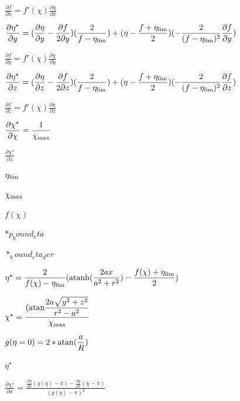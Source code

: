 \documentclass{article}
\begin{document}
$ \displaystyle\frac{\partial f}{\partial x} = f'(\chi) \displaystyle\frac{\partial \chi}{\partial x}$
\pagebreak

$ \displaystyle\frac{\partial \eta^\star}{\partial y } = (\displaystyle\frac{\partial \eta}{\partial y} - \displaystyle\frac{\partial f}{2\partial y}) (\displaystyle\frac{2}{f - \eta_{\rm lim}}) + (\eta - \displaystyle\frac{f+\eta_{\rm lim}}{2}) (-\displaystyle\frac{2}{(f-\eta_{\rm lim})^2} \displaystyle\frac{\partial f}{\partial y}) $
\pagebreak

$ \displaystyle\frac{\partial f}{\partial y} = f'(\chi) \displaystyle\frac{\partial \chi}{\partial y}$
\pagebreak

$ \displaystyle\frac{\partial \eta^\star}{\partial z } = (\displaystyle\frac{\partial \eta}{\partial z} - \displaystyle\frac{\partial f}{2\partial z}) (\displaystyle\frac{2}{f - \eta_{\rm lim}}) + (\eta - \displaystyle\frac{f+\eta_{\rm lim}}{2}) (-\displaystyle\frac{2}{(f-\eta_{\rm lim})^2} \displaystyle\frac{\partial f}{\partial z}) $
\pagebreak

$ \displaystyle\frac{\partial f}{\partial z} = f'(\chi) \displaystyle\frac{\partial \chi}{\partial z}$
\pagebreak

$ \displaystyle\frac{\partial \chi^\star}{\partial \chi } = \displaystyle\frac{1}{\chi_{\rm max}} $
\pagebreak

$ \displaystyle\frac{\partial \chi^\star}{\partial z} $
\pagebreak

$ \eta_{\rm lim} $
\pagebreak

$ \chi_{\rm max} $
\pagebreak

$ f(\chi) $
\pagebreak

$ *p_bound_eta $
\pagebreak

$ *_bound_eta_der $
\pagebreak

$ \eta^\star = \displaystyle\frac{2}{f(\chi)-\eta_{\rm lim}} ({\rm atanh}(\displaystyle\frac{2ax}{a^2+r^2}) - \displaystyle\frac{f(\chi)+\eta_{\rm lim}}{2}) $
\pagebreak

$ \chi^\star = \displaystyle\frac{({\rm atan} \displaystyle\frac{2a\sqrt{y^2+z^2}}{r^2-a^2}} {\chi_{\rm max}} $
\pagebreak

$ g (\eta=0) = 2*{\rm atan}(\displaystyle\frac{a}{R}) $
\pagebreak

$ \eta^\star $
\pagebreak

$ \displaystyle\frac{\partial \chi^\star}{\partial x } = \displaystyle\frac{\displaystyle\frac{\partial \chi}{\partial x}(g(\eta) - \pi) - \displaystyle\frac{\partial g}{\partial x}(\chi - \pi)}{(g(\eta)-\pi)^2} $
\pagebreak
\end{document}
